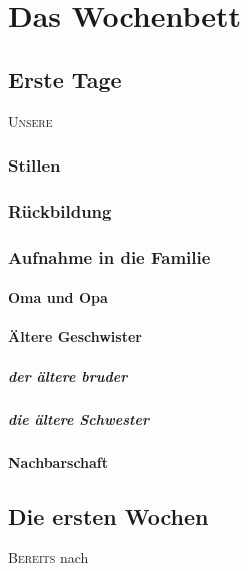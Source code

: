 \part*{Das Wochenbett}


\chapter*{Erste Tage}
\lettrine[lines=2, loversize=0.3, lraise=0]{\initfamily U}{nsere}

\section*{Stillen}

\section*{Rückbildung}

\section*{Aufnahme in die Familie}

\subsection*{Oma und Opa}

\subsection*{Ältere Geschwister}

\subsubsection*{der ältere bruder}

\subsubsection*{die ältere Schwester}

\subsection*{Nachbarschaft}

\chapter*{Die ersten Wochen}
\lettrine[lines=2, loversize=0.3, lraise=0]{\initfamily B}{ereits } nach
